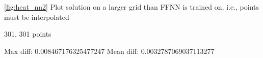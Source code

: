 \autoref{fig:heat_nn2} Plot solution on a larger grid than FFNN is trained on, i.e., points must be interpolated

301, 301 points

Max diff: 0.008467176325477247
Mean diff: 0.0032787069037113277

\begin{figure}[H]
\centering
{}
\qquad
{}
\qquad

\end{figure}

